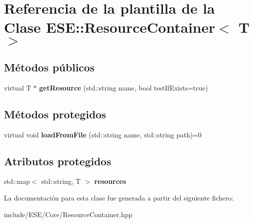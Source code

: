 \hypertarget{class_e_s_e_1_1_resource_container}{\section{Referencia de la plantilla de la Clase E\-S\-E\-:\-:Resource\-Container$<$ T $>$}
\label{class_e_s_e_1_1_resource_container}
}
\subsection*{Métodos públicos}
\begin{DoxyCompactItemize}
\item 
\hypertarget{class_e_s_e_1_1_resource_container_aaa52f82fc184b161ef4dc79f4c23b456}{virtual T $\ast$ {\bfseries get\-Resource} (std\-::string name, bool test\-If\-Exists=true)}\label{class_e_s_e_1_1_resource_container_aaa52f82fc184b161ef4dc79f4c23b456}

\end{DoxyCompactItemize}
\subsection*{Métodos protegidos}
\begin{DoxyCompactItemize}
\item 
\hypertarget{class_e_s_e_1_1_resource_container_a5a42af790f1a6baec2b426b20ab65989}{virtual void {\bfseries load\-From\-File} (std\-::string name, std\-::string path)=0}\label{class_e_s_e_1_1_resource_container_a5a42af790f1a6baec2b426b20ab65989}

\end{DoxyCompactItemize}
\subsection*{Atributos protegidos}
\begin{DoxyCompactItemize}
\item 
\hypertarget{class_e_s_e_1_1_resource_container_a520346f25f7e73e23751e1b2758784ab}{std\-::map$<$ std\-::string, T $>$ {\bfseries resources}}\label{class_e_s_e_1_1_resource_container_a520346f25f7e73e23751e1b2758784ab}

\end{DoxyCompactItemize}


La documentación para esta clase fue generada a partir del siguiente fichero\-:\begin{DoxyCompactItemize}
\item 
include/\-E\-S\-E/\-Core/Resource\-Container.\-hpp\end{DoxyCompactItemize}
